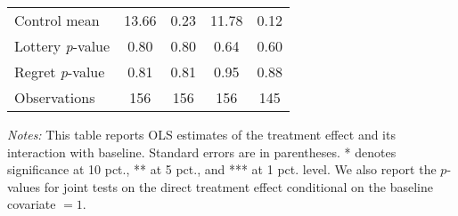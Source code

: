 \begin{table}[htbp]
{\begin{threeparttable}
\begin{tabular}{l*{4}{c}}
Control mean    &    13.66         &     0.23         &    11.78         &     0.12         \\
Lottery \emph{p}-value&     0.80         &     0.80         &     0.64         &     0.60         \\
Regret \emph{p}-value&     0.81         &     0.81         &     0.95         &     0.88         \\
Observations    &      156         &      156         &      156         &      145         \\
\bottomrule \end{tabular} \begin{tablenotes}[flushleft] \footnotesize \item \emph{Notes:} This table reports OLS estimates of the treatment effect and its interaction with baseline. Standard errors are in parentheses. * denotes significance at 10 pct., ** at 5 pct., and *** at 1 pct. level. We also report the \(p\)-values for joint tests on the direct treatment effect conditional on the baseline covariate $= 1$. \end{tablenotes} \end{threeparttable} } \end{table}
